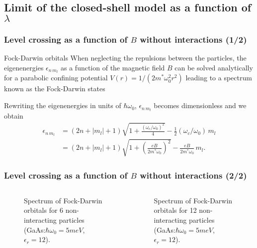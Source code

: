 \documentclass[xcolor=pdftex,hyperref={pdfpagelabels=false},table]{beamer}
\begin{document}
\subsection{Limit of the closed-shell model as a function of $\lambda$}
\begin{frame}
\frametitle{Level crossing as a function of $B$ without interactions (1/2)}
\begin{scriptsize}
\begin{block}{Fock-Darwin orbitals}
When neglecting the repulsions between the particles, the eigenenergies $\epsilon_{n \, m_l}$ as a function of the magnetic field $B$ can be solved analytically for a parabolic confining potential $V(r)=1/(2m^*\omega_0^2 r^2)$ leading to a spectrum known as the Fock-Darwin states

Rewriting the eigenenergies in units of $\hbar \omega_0$, $\epsilon_{n \, m_l}$ becomes dimensionless and we obtain
\begin{align}
 \epsilon_{n \, m_l} &= (2n+|m_l|+1)  \sqrt{1+\frac{(\omega_c/ \omega_0)^2}{4}} -\frac{1}{2}(\omega_c /\omega_0) \, m_l\\
&= (2n+|m_l|+1)  \sqrt{1+(\frac{e B}{2m^* \omega_0})^2} -\frac{e B}{2m^* \omega_0} \, m_l.
\end{align}
 \end{block}
\end{scriptsize}
\end{frame}

\begin{frame}
\frametitle{Level crossing as a function of $B$ without interactions (2/2)}
\begin{scriptsize}
\begin{columns}[T,l]
\column{5.5cm}
\begin{figure}
\centering
\scalebox{0.45}{}
\caption{Spectrum of Fock-Darwin orbitals for 6 non-interacting particles (GaAs:$\hbar \omega_0=5meV$,$\epsilon_r=12$).}
\end{figure}
\column{5.5cm}%
\begin{figure}
\centering
\scalebox{0.45}{}
\caption{Spectrum of Fock-Darwin orbitals for 12 non-interacting particles (GaAs:$\hbar \omega_0=5meV$,$\epsilon_r=12$).}
\end{figure}
\end{columns}
\end{scriptsize}
\end{frame}
\end{document}
